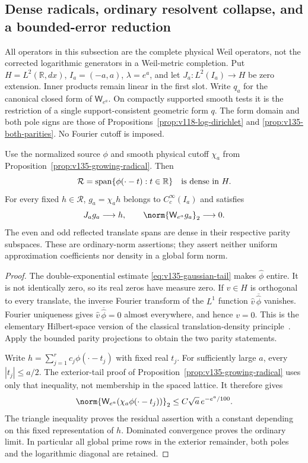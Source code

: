 \subsection*{Dense radicals, ordinary resolvent collapse, and a bounded-error reduction}

All operators in this subsection are the complete physical Weil operators,
not the corrected logarithmic generators in a Weil-metric completion.
Put $H=L^2(\mathbb R,dx)$, $I_a=(-a,a)$, $\lambda=e^a$, and let
$J_a:L^2(I_a)\to H$ be zero extension. Inner products remain linear in
the first slot. Write $q_a$ for the canonical closed form of
$\mathsf W_{e^a}$. On compactly supported smooth tests it is the
restriction of a single support-consistent geometric form $q$.
The form domain and both pole signs are those of
Propositions~\ref{prop:v118-log-dirichlet} and
\ref{prop:v135-both-parities}. No Fourier cutoff is imposed.

\begin{lemma}
\label{lem:v136-total-radicals}
Use the normalized source $\phi$ and smooth physical cutoff $\chi_a$
from Proposition~\ref{prop:v135-growing-radical}. Then
\[
 \mathcal R=\operatorname{span}\{\phi(\cdot-t):t\in\mathbb R\}
 \quad\hbox{is dense in }H.
\]
For every fixed $h\in\mathcal R$, $g_a=\chi_a h$ belongs to
$C_c^\infty(I_a)$ and satisfies
\begin{equation}\label{eq:v136-dense-residual}
 J_ag_a\longrightarrow h,\qquad
 \norm{\mathsf W_{e^a}g_a}_2\longrightarrow0.
\end{equation}
The even and odd reflected translate spans are dense in their respective
parity subspaces. These are ordinary-norm assertions; they assert neither
uniform approximation coefficients nor density in a global form norm.
\end{lemma}
\begin{proof}
The double-exponential estimate \eqref{eq:v135-gaussian-tail} makes
$\widehat\phi$ entire. It is not identically zero, so its real zeros
have measure zero. If $v\in H$ is orthogonal to every translate, the
inverse Fourier transform of the $L^1$ function
$\widehat v\,\overline{\widehat\phi}$ vanishes. Fourier uniqueness
gives $\widehat v\,\overline{\widehat\phi}=0$ almost everywhere,
and hence $v=0$. This is the elementary Hilbert-space version of the
classical translation-density principle~\cite{Wiener1932}.
Apply the bounded parity projections to obtain the two parity statements.

Write $h=\sum_{j=1}^r c_j\phi(\cdot-t_j)$ with fixed real $t_j$.
For sufficiently large $a$, every $|t_j|\le a/2$. The exterior-tail
proof of Proposition~\ref{prop:v135-growing-radical} uses only that
inequality, not membership in the spaced lattice. It therefore gives
\[
 \norm{\mathsf W_{e^a}(\chi_a\phi(\cdot-t_j))}_2
 \le C\sqrt a\,e^{-e^a/100}.
\]
The triangle inequality proves the residual assertion with a constant
depending on this fixed representation of $h$. Dominated convergence
proves the ordinary limit. In particular all global prime rows in the
exterior remainder, both poles and the logarithmic diagonal are retained.
\end{proof}

